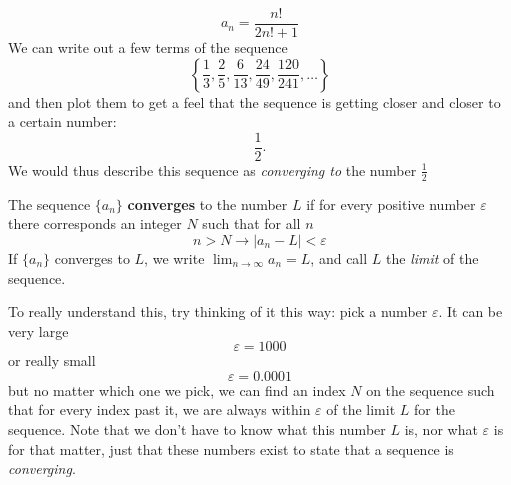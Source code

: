 \begin{ex}
\[ a_n = \frac{n!}{2n!+1} \]
  We can write out a few terms of the sequence
  \[
    \left\{
      \frac{1}{3},\frac{2}{5},\frac{6}{13},\frac{24}{49},\frac{120}{241},
    \ldots \right\}
  \]
  and then plot them %
  to get a feel that the
  sequence is getting closer and closer to a certain number: \[ \frac{1}{2}.\] We would
  thus describe this sequence as \emph{converging to} the number \( \frac{1}{2} \)
\end{ex}
\begin{defn}
  The sequence \(\{ a_n \}\) \textbf{converges} to the number \(L\) if for every
  positive number \(\varepsilon\) there corresponds an integer \(N\) such that
  for all \(n\)
  \[ n > N \to |a_n - L| < \varepsilon \]
  If \(\{a_n\}\) converges to \(L\), we write \(\lim_{n \to \infty} a_n = L\),
  and call \(L\) the \emph{limit} of the sequence.
\end{defn}
  To really understand this, try thinking of it this way: pick a number $\varepsilon$. It can be very large
  \[ \varepsilon=1000\]
  or really small
  \[ \varepsilon=0.0001\]
  but no matter which one we pick, we can find an index $N$ on the sequence such that for every index past it, we
  are always within $\varepsilon$ of the limit $L$ for the sequence.
  Note that we don't have to know what this number $L$ is, nor what $\varepsilon$ is for that matter, just that
  these numbers exist to state that a sequence is \emph{converging}.
